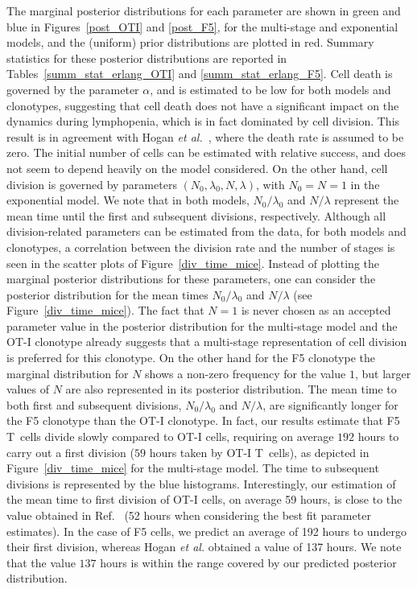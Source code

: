\documentclass[10pt]{article}
\numberwithin{equation}{section}
\begin{document}
The marginal posterior distributions for each parameter are shown in green and blue in Figures~\ref{post_OTI} and \ref{post_F5}, for the multi-stage and exponential models, and the (uniform) prior distributions are plotted in red. Summary statistics for these posterior distributions are reported in Tables~\ref{summ_stat_erlang_OTI} and \ref{summ_stat_erlang_F5}. Cell death is governed by the parameter $\alpha$, and is estimated to be low for both models and clonotypes, suggesting that cell death does not have a significant impact on the dynamics during lymphopenia, which is in fact dominated by cell division. This result is in agreement with Hogan {\em et al.}~\cite{hogan}, where the death rate is assumed to be zero. The initial number of cells can be estimated with relative success, and does not seem to depend heavily on the model considered. On the other hand, cell division is governed by parameters $(N_0,\lambda_0,N,\lambda)$, with $N_0=N=1$ in the exponential model. We note that in both models, $N_0/\lambda_0$ and $N/\lambda$ represent the mean time until the first and subsequent divisions, respectively. Although all division-related parameters can be estimated from the data, for both models and clonotypes, a correlation between the division rate and the number of stages is seen in the scatter plots of Figure~\ref{div_time_mice}. Instead of plotting the marginal posterior distributions for these parameters, one can consider the posterior distribution for the mean times $N_0/\lambda_0$ and $N/\lambda$ (see Figure~\ref{div_time_mice}). The fact that $N=1$ is never chosen as an accepted parameter value in the posterior distribution for the multi-stage model and the OT-I clonotype already suggests that a multi-stage representation of cell division is preferred for this clonotype. On the other hand  for the F5 clonotype the marginal distribution for $N$ shows a 
non-zero frequency for the value $1$, but larger values of $N$ are also represented in its posterior distribution. The mean time to both first and subsequent divisions, $N_0/\lambda_0$ and $N / \lambda$, are significantly longer for the F5 clonotype than the OT-I clonotype. In fact, our results estimate that F5 T~cells divide slowly compared to OT-I cells, requiring on average $192$ hours to carry out a first division  ($59$ hours taken by OT-I T~cells), as depicted in Figure~\ref{div_time_mice} for the multi-stage model.
The time to subsequent divisions is represented by the blue histograms. Interestingly, our estimation of the mean time to first division of OT-I cells, on average 59 hours, is close to the value obtained in Ref.~\cite{hogan}  (52 hours when considering the best fit parameter estimates). 
In the case of F5 cells, we predict an average of 192 hours
 to undergo their first division, whereas
 Hogan {\em et al.} obtained a value of 137 hours.
We  note that the value $137$ hours is within the range covered by our predicted posterior distribution.
\end{document}
